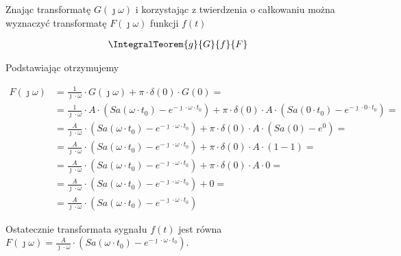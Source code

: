 \begin{task}
Znając transformatę $G(\jmath \omega)$ i korzystając z twierdzenia o całkowaniu można wyznaczyć transformatę $F(\jmath \omega)$ funkcji $f(t)$

\begin{align*}
\IntegralTeorem{g}{G}{f}{F}
\end{align*}
 
 Podstawiając otrzymujemy
 
\begin{align*}
F(\jmath \omega) &= \frac{1}{\jmath \cdot \omega} \cdot G(\jmath \omega) + \pi \cdot \delta(0) \cdot G(0)=\\
&=\frac{1}{\jmath \cdot \omega} \cdot A \cdot \left( Sa\left( \omega \cdot t_0\right) - e^{-\jmath \cdot \omega \cdot t_0} \right) + \pi \cdot \delta(0) \cdot A \cdot \left( Sa\left( 0 \cdot t_0\right) - e^{-\jmath \cdot 0 \cdot t_0} \right)=\\
&=\frac{A}{\jmath \cdot \omega} \cdot \left( Sa\left( \omega \cdot t_0\right) - e^{-\jmath \cdot \omega \cdot t_0} \right) + \pi \cdot \delta(0) \cdot A \cdot \left( Sa\left( 0 \right) - e^{0} \right)=\\
&=\frac{A}{\jmath \cdot \omega} \cdot \left( Sa\left( \omega \cdot t_0\right) - e^{-\jmath \cdot \omega \cdot t_0} \right) + \pi \cdot \delta(0) \cdot A \cdot \left( 1 - 1 \right)=\\
&=\frac{A}{\jmath \cdot \omega} \cdot \left( Sa\left( \omega \cdot t_0\right) - e^{-\jmath \cdot \omega \cdot t_0} \right) + \pi \cdot \delta(0) \cdot A \cdot 0=\\
&=\frac{A}{\jmath \cdot \omega} \cdot \left( Sa\left( \omega \cdot t_0\right) - e^{-\jmath \cdot \omega \cdot t_0} \right) + 0=\\
&=\frac{A}{\jmath \cdot \omega} \cdot \left( Sa\left( \omega \cdot t_0\right) - e^{-\jmath \cdot \omega \cdot t_0} \right)
\end{align*}


Ostatecznie transformata sygnału $f(t)$ jest równa $F(\jmath \omega)=\frac{A}{\jmath \cdot \omega} \cdot \left( Sa\left( \omega \cdot t_0\right) - e^{-\jmath \cdot \omega \cdot t_0} \right)$.


\end{task}


